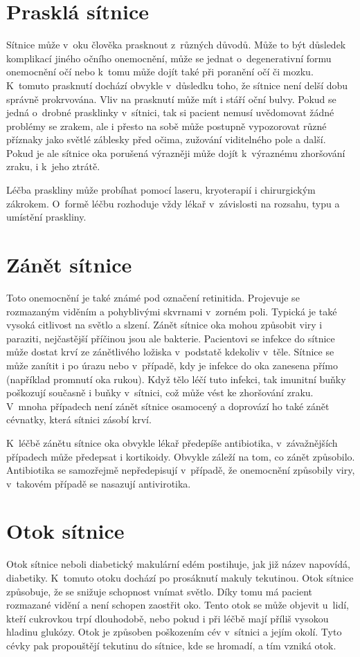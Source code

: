 \section{Prasklá sítnice}
Sítnice může v~oku člověka prasknout z~různých důvodů. Může to být důsledek komplikací jiného očního onemocnění, může se jednat o~degenerativní formu onemocnění očí nebo k~tomu může dojít také při poranění očí či mozku. K~tomuto prasknutí dochází obvykle v~důsledku toho, že sítnice není delší dobu správně prokrvována. Vliv na prasknutí může mít i stáří oční bulvy.
Pokud se jedná o~drobné prasklinky v~sítnici, tak si pacient nemusí uvědomovat žádné problémy se zrakem, ale i přesto na sobě může postupně vypozorovat různé příznaky jako světlé záblesky před očima, zužování viditelného pole a další. Pokud je ale sítnice oka porušená výrazněji může dojít k~výraznému zhoršování zraku, i k~jeho ztrátě.

Léčba praskliny může probíhat pomocí laseru, kryoterapií i chirurgickým zákrokem. O~formě léčbu rozhoduje vždy lékař v~závislosti na rozsahu, typu a umístění praskliny.


\section{Zánět sítnice}
Toto onemocnění je také známé pod označení retinitida. Projevuje se rozmazaným viděním a pohyblivými skvrnami v~zorném poli. Typická je také vysoká citlivost na světlo a slzení. Zánět sítnice oka mohou způsobit viry i paraziti, nejčastější příčinou jsou ale bakterie. Pacientovi se infekce do sítnice může dostat krví ze zánětlivého ložiska v~podstatě kdekoliv v~těle. Sítnice se může zanítit i po úrazu nebo v~případě, kdy je infekce do oka zanesena přímo (například promnutí oka rukou). Když tělo léčí tuto infekci, tak imunitní buňky poškozují současně i buňky v~sítnici, což může vést ke zhoršování zraku. V~mnoha případech není zánět sítnice osamocený a doprovází ho také zánět cévnatky, která sítnici zásobí krví.

K~léčbě zánětu sítnice oka obvykle lékař předepíše antibiotika, v~závažnějších případech může předepsat i kortikoidy. Obvykle záleží na tom, co zánět způsobilo. Antibiotika se samozřejmě nepředepisují v~případě, že onemocnění způsobily viry, v~takovém případě se nasazují antivirotika.


\section{Otok sítnice}
Otok sítnice neboli diabetický makulární edém postihuje, jak již název napovídá, diabetiky. K~tomuto otoku dochází po prosáknutí makuly tekutinou. Otok sítnice způsobuje, že se snižuje schopnost vnímat světlo. Díky tomu  má pacient rozmazané vidění a není schopen zaostřit oko. Tento otok se může objevit u~lidí, kteří cukrovkou trpí dlouhodobě, nebo pokud i při léčbě mají příliš vysokou hladinu glukózy. Otok je způsoben poškozením cév v~sítnici a jejím okolí. Tyto cévky pak propouštějí tekutinu do sítnice, kde se hromadí, a tím vzniká otok.

